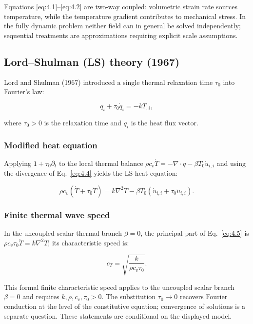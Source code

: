 Equations \eqref{eq:4.1}--\eqref{eq:4.2} are two-way coupled: volumetric strain rate sources temperature, while the temperature gradient contributes to mechanical stress. In the fully dynamic problem neither field can in general be solved independently; sequential treatments are approximations requiring explicit scale assumptions.

\subsection{Lord--Shulman (LS) theory (1967)}
\label{sec:4.3}

Lord and Shulman (1967) \cite{Lord1967} introduced a single thermal relaxation time $\tau_0$ into Fourier's law:

\begin{equation}
q_i + \tau_0 \dot{q}_i = -k T_{,i},
\label{eq:4.4}
\end{equation}

where $\tau_0 > 0$ is the relaxation time and $q_i$ is the heat flux vector.

\subsubsection{Modified heat equation}

Applying $1+\tau_0\partial_t$ to the local thermal balance $\rho c_v\dot T=-\nabla\cdot q-\beta T_0\dot u_{i,i}$ and using the divergence of Eq.~\eqref{eq:4.4} yields the LS heat equation:

\begin{equation}
\rho c_v \left(\dot{T} + \tau_0 \ddot{T}\right)
= k\nabla^2 T
- \beta T_0 (\dot{u}_{i,i} + \tau_0 \ddot{u}_{i,i}).
\label{eq:4.5}
\end{equation}

\subsubsection{Finite thermal wave speed}

In the uncoupled scalar thermal branch $\beta=0$, the principal part of Eq.~\eqref{eq:4.5} is $\rho c_v\tau_0\ddot T=k\nabla^2T$; its characteristic speed is:

\begin{equation}
c_T = \sqrt{\frac{k}{\rho c_v \tau_0}}.
\label{eq:4.6}
\end{equation}

This formal finite characteristic speed applies to the uncoupled scalar branch $\beta=0$ and requires $k,\rho,c_v,\tau_0>0$. The substitution $\tau_0\to0$ recovers Fourier conduction at the level of the constitutive equation; convergence of solutions is a separate question. These statements are conditional on the displayed model.

